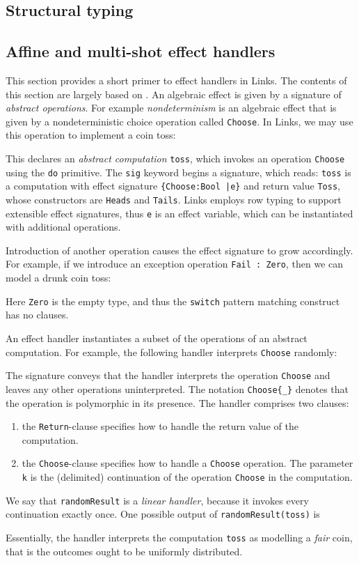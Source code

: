 \documentclass[mscres,cdtppar,twoside,openright,logo,rightchapter,normalheadings]{infthesis}
\theoremstyle{definition}
\begin{document}
\subsection{Structural typing}

\subsection{Affine and multi-shot effect handlers}
\label{sec:links-affine-multi}

This section provides a short primer to effect handlers in Links. The
contents of this section are largely based on
\cite{Hillerstrom2016b}. An algebraic effect is given by a signature
of \emph{abstract operations}. For example \emph{nondeterminism} is an
algebraic effect that is given by a nondeterministic choice operation
called \lstinline$Choose$. In Links, we may use this operation to
implement a coin toss:
%

%
This declares an \emph{abstract computation} \lstinline$toss$, which
invokes an operation \lstinline$Choose$ using the \lstinline$do$
primitive.  The \lstinline$sig$ keyword begins a signature, which
reads: \lstinline$toss$ is a computation with effect signature
\lstinline${Choose:Bool |e}$ and return value \lstinline$Toss$, whose
constructors are \lstinline$Heads$ and \lstinline$Tails$.  Links
employs row typing to support extensible effect signatures, thus
\lstinline$e$ is an effect variable, which can be instantiated with
additional operations.

Introduction of another operation causes the effect signature to grow
accordingly. For example, if we introduce an exception operation
\lstinline$Fail : Zero$, then we can model a drunk coin toss:
%

%
Here \lstinline$Zero$ is the empty type, and thus the
\lstinline$switch$ pattern matching construct has no clauses.

An effect handler instantiates a subset of the operations of an
abstract computation. For example, the following handler interprets
\lstinline$Choose$ randomly:
%

%
The signature conveys that the handler interprets the operation
\lstinline$Choose$ and leaves any other operations uninterpreted. The
notation \lstinline$Choose{_}$ denotes that the operation is
polymorphic in its presence.  The handler comprises two clauses:
\begin{enumerate}[1)]
  \item the \lstinline$Return$-clause specifies how to handle the return
    value of the computation.
  \item the \lstinline$Choose$-clause specifies how to handle a
    \lstinline$Choose$ operation. The parameter \lstinline$k$ is the
    (delimited) continuation of the operation \lstinline$Choose$ in the
    computation.
\end{enumerate}
We say that \lstinline$randomResult$ is a \emph{linear handler},
because it invokes every continuation exactly once. One possible
output of \lstinline$randomResult(toss)$ is
%

%
Essentially, the handler interprets the computation \lstinline$toss$
as modelling a \emph{fair} coin, that is the outcomes ought to be
uniformly distributed.
\end{document}
